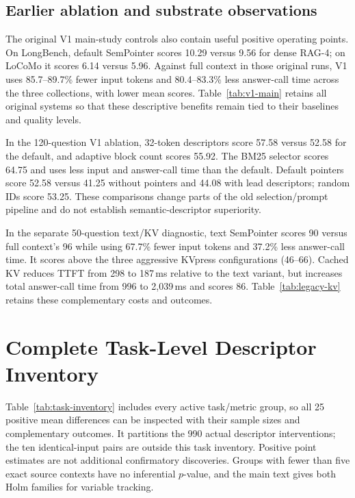 \documentclass[runningheads]{llncs}
\begin{document}
\subsection{Earlier ablation and substrate observations}
The original V1 main-study controls also contain useful positive operating points. On LongBench, default SemPointer scores 10.29 versus 9.56 for dense RAG-4; on LoCoMo it scores 6.14 versus 5.96. Against full context in those original runs, V1 uses 85.7--89.7\% fewer input tokens and 80.4--83.3\% less answer-call time across the three collections, with lower mean scores. Table~\ref{tab:v1-main} retains all original systems so that these descriptive benefits remain tied to their baselines and quality levels.

\clearpage
In the 120-question V1 ablation, 32-token descriptors score 57.58 versus 52.58 for the default, and adaptive block count scores 55.92. The BM25 selector scores 64.75 and uses less input and answer-call time than the default. Default pointers score 52.58 versus 41.25 without pointers and 44.08 with lead descriptors; random IDs score 53.25. These comparisons change parts of the old selection/prompt pipeline and do not establish semantic-descriptor superiority.

In the separate 50-question text/KV diagnostic, text SemPointer scores 90 versus full context's 96 while using 67.7\% fewer input tokens and 37.2\% less answer-call time. It scores above the three aggressive KVpress configurations (46--66). Cached KV reduces TTFT from 298 to 187\,ms relative to the text variant, but increases total answer-call time from 996 to 2,039\,ms and scores 86. Table~\ref{tab:legacy-kv} retains these complementary costs and outcomes.


\clearpage
\section{Complete Task-Level Descriptor Inventory}\label{sec:task-inventory}
Table~\ref{tab:task-inventory} includes every active task/metric group, so all 25 positive mean differences can be inspected with their sample sizes and complementary outcomes. It partitions the 990 actual descriptor interventions; the ten identical-input pairs are outside this task inventory. Positive point estimates are not additional confirmatory discoveries. Groups with fewer than five exact source contexts have no inferential $p$-value, and the main text gives both Holm families for variable tracking.

\clearpage


\end{document}
